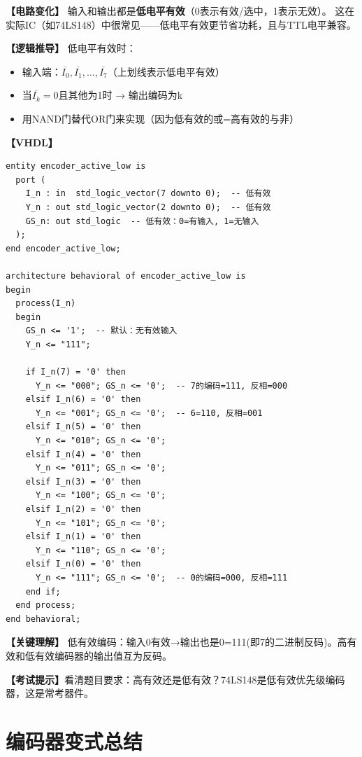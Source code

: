 \begin{detailbox}[完整教学]

\textbf{【电路变化】}
输入和输出都是\textbf{低电平有效}（0表示有效/选中，1表示无效）。
这在实际IC（如74LS148）中很常见——低电平有效更节省功耗，且与TTL电平兼容。

\textbf{【逻辑推导】}
低电平有效时：
\begin{itemize}
  \item 输入端：$\overline{I_0}, \overline{I_1}, ..., \overline{I_7}$（上划线表示低电平有效）
  \item 当$\overline{I_k}=0$且其他为1时 → 输出编码为k
  \item 用NAND门替代OR门来实现（因为低有效的或=高有效的与非）
\end{itemize}

\textbf{【VHDL】}
\begin{lstlisting}
entity encoder_active_low is
  port (
    I_n : in  std_logic_vector(7 downto 0);  -- 低有效
    Y_n : out std_logic_vector(2 downto 0);  -- 低有效
    GS_n: out std_logic  -- 低有效：0=有输入, 1=无输入
  );
end encoder_active_low;

architecture behavioral of encoder_active_low is
begin
  process(I_n)
  begin
    GS_n <= '1';  -- 默认：无有效输入
    Y_n <= "111";

    if I_n(7) = '0' then
      Y_n <= "000"; GS_n <= '0';  -- 7的编码=111, 反相=000
    elsif I_n(6) = '0' then
      Y_n <= "001"; GS_n <= '0';  -- 6=110, 反相=001
    elsif I_n(5) = '0' then
      Y_n <= "010"; GS_n <= '0';
    elsif I_n(4) = '0' then
      Y_n <= "011"; GS_n <= '0';
    elsif I_n(3) = '0' then
      Y_n <= "100"; GS_n <= '0';
    elsif I_n(2) = '0' then
      Y_n <= "101"; GS_n <= '0';
    elsif I_n(1) = '0' then
      Y_n <= "110"; GS_n <= '0';
    elsif I_n(0) = '0' then
      Y_n <= "111"; GS_n <= '0';  -- 0的编码=000, 反相=111
    end if;
  end process;
end behavioral;
\end{lstlisting}

\textbf{【关键理解】}
低有效编码：输入0有效→输出也是0=111(即7的二进制反码)。高有效和低有效编码器的输出值互为反码。

\textbf{【考试提示】}看清题目要求：高有效还是低有效？74LS148是低有效优先级编码器，这是常考器件。

\end{detailbox}


\section{编码器变式总结}

